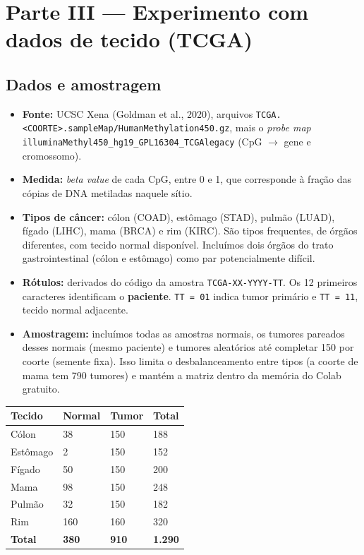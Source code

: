 \documentclass[11pt,a4paper]{article}
\providecommand{\tightlist}{\setlength{\itemsep}{0pt}\setlength{\parskip}{0pt}}
\begin{document}
\section{Parte III --- Experimento com dados de tecido (TCGA)}

\subsection{Dados e amostragem}

\begin{itemize}
\tightlist
\item
  \textbf{Fonte:} UCSC Xena (Goldman et al., 2020), arquivos
  \texttt{TCGA.\textless{}COORTE\textgreater{}.sampleMap/HumanMethylation450.gz},
  mais o \emph{probe map} \texttt{illuminaMethyl450\_hg19\_GPL16304\_TCGAlegacy}
  (CpG $\rightarrow$ gene e cromossomo).
\item
  \textbf{Medida:} \emph{beta value} de cada CpG, entre 0 e 1, que corresponde à
  fração das cópias de DNA metiladas naquele sítio.
\item
  \textbf{Tipos de câncer:} cólon (COAD), estômago (STAD), pulmão (LUAD), fígado
  (LIHC), mama (BRCA) e rim (KIRC). São tipos frequentes, de órgãos diferentes,
  com tecido normal disponível. Incluímos dois órgãos do trato gastrointestinal
  (cólon e estômago) como par potencialmente difícil.
\item
  \textbf{Rótulos:} derivados do código da amostra \texttt{TCGA-XX-YYYY-TT}. Os
  12 primeiros caracteres identificam o \textbf{paciente}. \texttt{TT\ =\ 01}
  indica tumor primário e \texttt{TT\ =\ 11}, tecido normal adjacente.
\item
  \textbf{Amostragem:} incluímos todas as amostras normais, os tumores pareados
  desses normais (mesmo paciente) e tumores aleatórios até completar 150 por
  coorte (semente fixa). Isso limita o desbalanceamento entre tipos (a coorte de
  mama tem 790 tumores) e mantém a matriz dentro da memória do Colab gratuito.
\end{itemize}

{\def\LTcaptype{none} %
\begin{longtable}[]{@{}llll@{}}
\toprule\noalign{}
Tecido & Normal & Tumor & Total \\
\midrule\noalign{}
\endhead
\bottomrule\noalign{}
\endlastfoot
Cólon & 38 & 150 & 188 \\
Estômago & 2 & 150 & 152 \\
Fígado & 50 & 150 & 200 \\
Mama & 98 & 150 & 248 \\
Pulmão & 32 & 150 & 182 \\
Rim & 160 & 160 & 320 \\
\textbf{Total} & \textbf{380} & \textbf{910} & \textbf{1.290} \\
\end{longtable}
}
\end{document}
